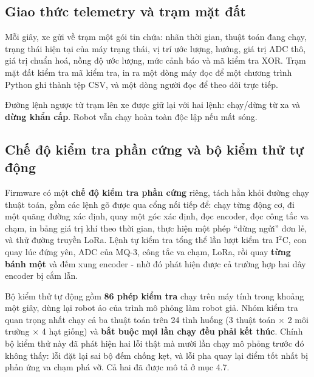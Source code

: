\subsection{Giao thức telemetry và trạm mặt đất}
Mỗi giây, xe gửi về trạm một gói tin chứa: nhãn thời gian, thuật toán đang chạy, trạng thái hiện tại của máy trạng thái, vị trí ước lượng, hướng, giá trị ADC thô, giá trị chuẩn hoá, nồng độ ước lượng, mức cảnh báo và mã kiểm tra XOR. Trạm mặt đất kiểm tra mã kiểm tra, in ra một dòng máy đọc để một chương trình Python ghi thành tệp CSV, và một dòng người đọc để theo dõi trực tiếp.

Đường lệnh ngược từ trạm lên xe được giữ lại với hai lệnh: chạy/dừng từ xa và \textbf{dừng khẩn cấp}. Robot vẫn chạy hoàn toàn độc lập nếu mất sóng.


\subsection{Chế độ kiểm tra phần cứng và bộ kiểm thử tự động}
Firmware có một \textbf{chế độ kiểm tra phần cứng} riêng, tách hẳn khỏi đường chạy thuật toán, gồm các lệnh gõ được qua cổng nối tiếp để: chạy từng động cơ, đi một quãng đường xác định, quay một góc xác định, đọc encoder, đọc công tắc va chạm, in bảng giá trị khí theo thời gian, thực hiện một phép ``dừng ngửi'' đơn lẻ, và thử đường truyền LoRa. Lệnh tự kiểm tra tổng thể lần lượt kiểm tra I$^{2}$C, con quay lúc đứng yên, ADC của MQ-3, công tắc va chạm, LoRa, rồi quay \textbf{từng bánh một} và đếm xung encoder - nhờ đó phát hiện được cả trường hợp hai dây encoder bị cắm lẫn.

Bộ kiểm thử tự động gồm \textbf{86 phép kiểm tra} chạy trên máy tính trong khoảng một giây, dùng lại robot ảo của trình mô phỏng làm robot giả. Nhóm kiểm tra quan trọng nhất chạy cả ba thuật toán trên 24 tình huống (3 thuật toán $\times$ 2 môi trường $\times$ 4 hạt giống) và \textbf{bắt buộc mọi lần chạy đều phải kết thúc}. Chính bộ kiểm thử này đã phát hiện hai lỗi thật mà mười lần chạy mô phỏng trước đó không thấy: lỗi đặt lại sai bộ đếm chống kẹt, và lỗi pha quay lại điểm tốt nhất bị phản ứng va chạm phá vỡ. Cả hai đã được mô tả ở mục 4.7.
